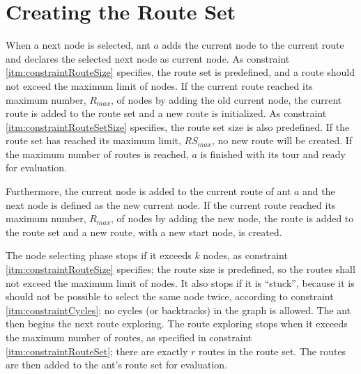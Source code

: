 \section{Creating the Route Set}

When a next node is selected, ant $a$ adds the current node to the current route and declares the selected next node as current node. As constraint \vref{itm:constraintRouteSize} specifies, the route set is predefined, and a route should not exceed the maximum limit of nodes. If the current route reached its maximum number, $R_{max}$, of nodes by adding the old current node, the current route is added to the route set and a new route is initialized. As constraint \vref{itm:constraintRouteSetSize} specifies, the route set size is also predefined. If the route set has reached its maximum limit, $RS_{max}$, no new route will be created. If the maximum number of routes is reached, $a$ is finished with its tour and ready for evaluation. 



Furthermore, the current node is added to the current route of ant $a$ and the next node is defined as the new current node. If the current route reached its maximum number, $R_{max}$, of nodes by adding the new node, the route is added to the route set and a new route, with a new start node, is created. 


The node selecting phase stops if it exceeds $k$ nodes, as constraint \ref{itm:constraintRouteSize} specifies; the route size is predefined, so the routes shall not exceed the maximum limit of nodes. It also stops if it is ``stuck'', because it is should not be possible to select the same node twice, according to constraint \ref{itm:constraintCycles}; no cycles (or backtracks) in the graph is allowed. The ant then begins the next route exploring. The route exploring stops when it exceeds the maximum number of routes, as specified in constraint \ref{itm:constraintRouteSet}; there are exactly $r$ routes in the route set. The routes are then added to the ant's route set for evaluation.
